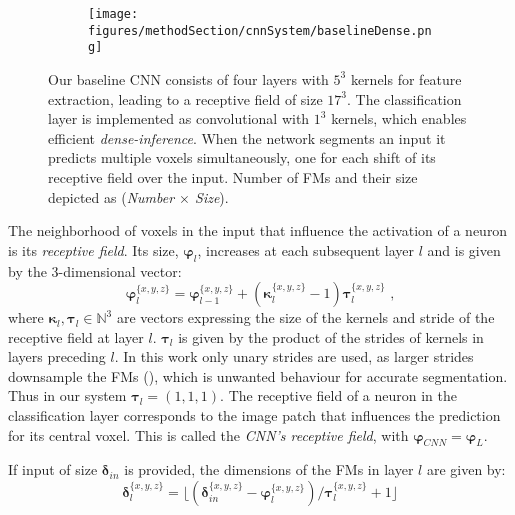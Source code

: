 \documentclass[preprint,authoryear,12pt]{elsarticle}
\newcommand{\eqcm}{\textrm{ ,}}
\begin{document}
\begin{figure}[!h]
\centering
\iftrue
\begin{subfigure}[b]{1.0\textwidth}
\centering
	\texttt{[image: figures/methodSection/cnnSystem/baselineDense.png]}
\end{subfigure}
\fi
\caption{Our baseline CNN consists of four layers with $5^3$ kernels for feature extraction, leading to a receptive field of size $17^3$. The classification layer is implemented as convolutional with $1^3$ kernels, which enables efficient \textit{dense-inference}. When the network segments an input it predicts multiple voxels simultaneously, one for each shift of its receptive field over the input. Number of FMs and their size depicted as (\textit{Number $\times$ Size}).}
\label{fig:cnnBaseline}
\end{figure}
 
The neighborhood of voxels in the input that influence the activation of a neuron is its \textit{receptive field}. Its size, $\boldsymbol{\varphi}_l$, increases at each subsequent layer $l$ and is given by the 3-dimensional vector: 
\begin{equation} \label{eq:receptiveFile}
\boldsymbol{\varphi}_l^{\{ x,y,z\}} = \boldsymbol{\varphi}_{l-1}^{\{ x,y,z\}} + (\boldsymbol{\kappa}_l^{\{ x,y,z\}}-1) \boldsymbol{\tau}_l^{\{ x,y,z\}} \eqcm
\end{equation}
where $\boldsymbol{\kappa}_l,\boldsymbol{\tau}_l \in \mathbb{N}^3$ are vectors expressing the size of the kernels and stride of the receptive field at layer $l$. $\boldsymbol{\tau}_l$ is given by the product of the strides of kernels in layers preceding $l$. In this work only unary strides are used, as larger strides downsample the FMs (\cite{Springenberg2015}), which is unwanted behaviour for accurate segmentation. Thus in our system $\boldsymbol{\tau}_l = (1,1,1)$. The receptive field of a neuron in the classification layer corresponds to the image patch that influences the prediction for its central voxel. This is called the \textit{CNN's receptive field}, with $\boldsymbol{\varphi}_{CNN}=\boldsymbol{\varphi}_{L}$.

If input of size $\boldsymbol{\delta}_{in}$ is provided, the dimensions of the FMs in layer $l$ are given by:
\begin{equation} \label{eq:fmSize}
\boldsymbol{\delta}_l^{\{ x,y,z\}} = \lfloor (\boldsymbol{\delta}_{in}^{\{ x,y,z\}} - \boldsymbol{\varphi}_l^{\{ x,y,z\}}) / \boldsymbol{\tau}_l^{\{ x,y,z\}}	 +1 \rfloor
\end{equation}
\end{document}
